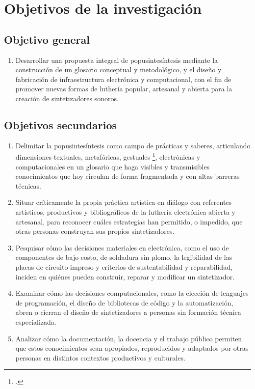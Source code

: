 \documentclass[../candidatura.tex]{subfiles}
\begin{document}
\section{Objetivos de la investigación}


\subsection{Objetivo general}

\begin{enumerate}
    \item Desarrollar una propuesta integral de popusintesíntesis mediante la construcción de un glosario conceptual y metodológico, y el diseño y fabricación de infraestructura electrónica y computacional, con el fin de promover nuevas formas de luthería popular, artesanal y abierta para la creación de sintetizadores sonoros.
\end{enumerate}

\subsection{Objetivos secundarios}

\begin{enumerate}
    \item Delimitar la popusintesíntesis como campo de prácticas y saberes, articulando dimensiones textuales, metafóricas, gestuales \footcite{haudricourt_cultivo_2019}, electrónicas y computacionales en un glosario que haga visibles y transmisibles conocimientos que hoy circulan de forma fragmentada y con altas barreras técnicas.
    \item Situar críticamente la propia práctica artística en diálogo con referentes artísticos, productivos y bibliográficos de la luthería electrónica abierta y artesanal, para reconocer cuáles estrategias han permitido, o impedido, que otras personas construyan sus propios sintetizadores.
    \item Pesquisar cómo las decisiones materiales en electrónica, como el uso de componentes de bajo costo, de soldadura sin plomo, la legibilidad de las placas de circuito impreso y criterios de sustentabilidad y reparabilidad, inciden en quiénes pueden construir, reparar y modificar un sintetizador.
    \item Examinar cómo las decisiones computacionales, como la elección de lenguajes de programación, el diseño de bibliotecas de código y la automatización, abren o cierran el diseño de sintetizadores a personas sin formación técnica especializada.
    \item Analizar cómo la documentación, la docencia y el trabajo público permiten que estos conocimientos sean apropiados, reproducidos y adaptados por otras personas en distintos contextos productivos y culturales.
\end{enumerate}
\end{document}
